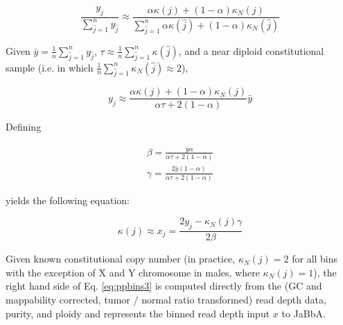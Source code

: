 \documentclass[phd,tocprelim]{cornell}
\begin{document}
\begin{equation} \label{eq:ppbins}
    \frac{y_j}{\sum_{\hat{j} = 1}^n y_{\hat{j}}} \approx \frac{\alpha \kappa(j) + (1-\alpha)\kappa_N(j)}{\sum_{\hat{j} = 1}^n \alpha \kappa(\hat{j}) + (1-\alpha)\kappa_N(\hat{j})}
\end{equation}

Given $\bar{y} = \frac{1}{n}\sum_{\hat{j} = 1}^{n} y_{\hat{j}}$, $\tau \approx \frac{1}{n}\sum_{\hat{j} = 1}^{n} \kappa(\hat{j})$, and a near diploid constitutional sample (i.e. in which $\frac{1}{n}\sum_{\hat{j} = 1}^{n} \kappa_N(\hat{j}) \approx 2$),

\begin{equation} \label{eq:ppbins2}
    y_j \approx \frac{\alpha\kappa(j) + (1-\alpha)\kappa_N(j)}{\alpha \tau + 2(1-\alpha)} \bar{y}
\end{equation}

Defining

\begin{equation} \label{eq:purityploidycorrection}
    \begin{split}
        \beta = \frac{\bar{y}\alpha}{\alpha\tau+2(1-\alpha)} \\
        \gamma = \frac{2\bar{y}(1-\alpha)}{\alpha\tau+2(1-\alpha)}
    \end{split}
\end{equation}

yields the following equation:

\begin{equation} \label{eq:ppbins3}
    \kappa(j) \approx x_j = \frac{2y_j - \kappa_N(j)\gamma}{2\beta}
\end{equation}

Given known constitutional copy number (in practice, $\kappa_N(j) = 2$ for all bins with the exception of X and Y chromosome in males, where $\kappa_N(j) = 1$), the right hand side of Eq. \ref{eq:ppbins3} is computed directly from the (GC and mappability corrected, tumor / normal ratio transformed) read depth data, purity, and ploidy and represents the binned read depth input $x$ to JaBbA.
\end{document}
